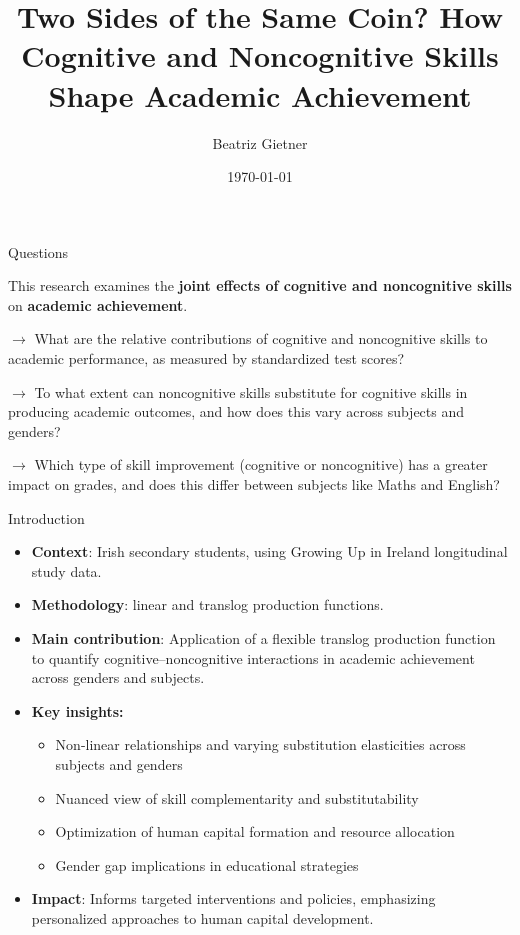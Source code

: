 \documentclass{beamer}
\title[Cognitive and Noncognitive Factors]{Two Sides of the Same Coin? How Cognitive and Noncognitive Skills Shape Academic Achievement}
\author[Beatriz Gietner]{Beatriz Gietner}
\institute[UCD]{UCD School of Economics}
\date{\today}
\begin{document}
\begin{frame}
\titlepage
\end{frame}

\begin{frame}{Questions}

This research examines the \textbf{joint effects of cognitive and noncognitive skills} on \textbf{academic achievement}.\

$\rightarrow$ What are the relative contributions of cognitive and noncognitive skills to academic performance, as measured by standardized test scores?

$\rightarrow$ To what extent can noncognitive skills substitute for cognitive skills in producing academic outcomes, and how does this vary across subjects and genders?

$\rightarrow$ Which type of skill improvement (cognitive or noncognitive) has a greater impact on grades, and does this differ between subjects like Maths and English?

\end{frame}

\begin{frame}{Introduction}
\begin{itemize}
\item \textbf{Context}: Irish secondary students, using Growing Up in Ireland longitudinal study data.
\item \textbf{Methodology}: linear and translog production functions.
\item \textbf{Main contribution}: Application of a flexible translog production function to quantify cognitive–noncognitive interactions in academic achievement across genders and subjects.
\vspace{0.5em}

\item \textbf{Key insights:}
\begin{itemize}
    \item Non-linear relationships and varying substitution elasticities across subjects and genders
    \item Nuanced view of skill complementarity and substitutability
    \item Optimization of human capital formation and resource allocation
    \item Gender gap implications in educational strategies
\end{itemize}

\vspace{0.5em}
\item \textbf{Impact}: Informs targeted interventions and policies, emphasizing personalized approaches to human capital development.

\end{itemize}
\end{frame}
\end{document}
